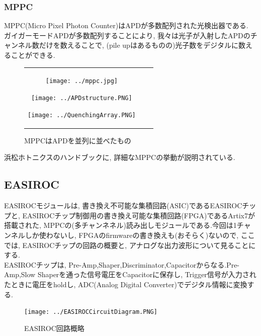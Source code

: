 \subsubsection{MPPC}
MPPC(Micro Pixel Photon Counter)はAPDが多数配列された光検出器である.
ガイガーモードAPDが多数配列することにより, 我々は光子が入射したAPDのチャンネル数だけを数えることで, (pile upはあるものの)光子数をデジタルに数えることができる.
\begin{figure}[h]
  \begin{tabular}{ccc}
    \begin{minipage}[t]{0.33\hsize}
      \begin{center}
        \texttt{[image: ../mppc.jpg]}
      \end{center}
      \caption{MPPC}
    \end{minipage}
    \begin{minipage}[t]{0.33\hsize}
      \begin{center}
        \texttt{[image: ../APDstructure.PNG]}
      \end{center}
      \caption{APD}
    \end{minipage}
    \begin{minipage}[t]{0.33\hsize}
      \begin{center}
        \texttt{[image: ../QuenchingArray.PNG]}
      \end{center}
      \caption{MPPCはAPDを並列に並べたもの}
    \end{minipage}
  \end{tabular}
\end{figure}

浜松ホトニクスのハンドブックに, 詳細なMPPCの挙動が説明されている.\cite{hamamatsu}

\subsection{EASIROC}
EASIROCモジュールは, 書き換え不可能な集積回路(ASIC)であるEASIROCチップと, EASIROCチップ制御用の書き換え可能な集積回路(FPGA)であるArtix7が搭載された, MPPCの(多チャンネネル)読み出しモジュールである.今回は1チャンネルしか使わないし, FPGAのfirmwareの書き換えも(おそらく)ないので, ここでは, EASIROCチップの回路の概要と, アナログな出力波形について見ることにする.\\
EASIROCチップは, Pre-Amp,Shaper,Discriminator,Capacitorからなる.Pre-Amp,Slow Shaperを通った信号電圧をCapacitorに保存し, Trigger信号が入力されたときに電圧をholdし, ADC(Analog Digital Converter)でデジタル情報に変換する.
\begin{figure}[H]
  \begin{center}
    \texttt{[image: ../EASIROCCircuitDiagram.PNG]}
  \end{center}
  \caption{EASIROC回路概略}
\end{figure}


